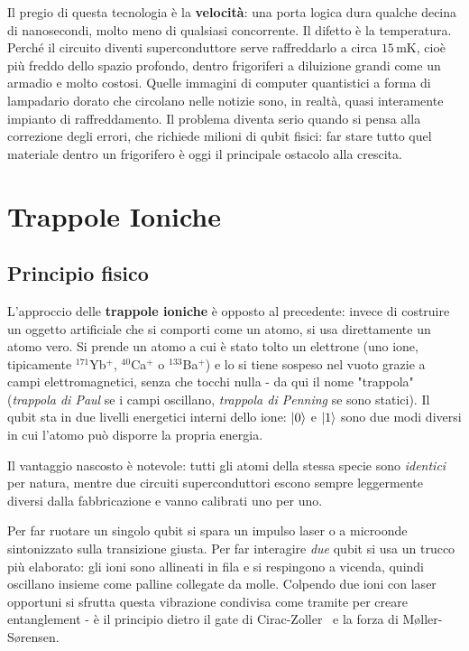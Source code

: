 Il pregio di questa tecnologia è la \textbf{velocità}: una porta logica dura
qualche decina di nanosecondi, molto meno di qualsiasi concorrente. Il difetto
è la temperatura. Perché il circuito diventi superconduttore serve raffreddarlo
a circa $15\,\text{mK}$, cioè più freddo dello spazio profondo, dentro
frigoriferi a diluizione grandi come un armadio e molto costosi. Quelle immagini
di computer quantistici a forma di lampadario dorato che circolano nelle notizie
sono, in realtà, quasi interamente impianto di raffreddamento. Il problema
diventa serio quando si pensa alla correzione degli errori, che richiede
milioni di qubit fisici: far stare tutto quel materiale dentro un frigorifero
è oggi il principale ostacolo alla crescita.

\section{Trappole Ioniche}
\label{sec:trap}

\subsection{Principio fisico}
\label{subsec:trap-principio}

L'approccio delle \textbf{trappole ioniche} è opposto al precedente: invece di
costruire un oggetto artificiale che si comporti come un atomo, si usa
direttamente un atomo vero. Si prende un atomo a cui è stato tolto un elettrone
(uno ione, tipicamente $^{171}$Yb$^+$, $^{40}$Ca$^+$ o $^{133}$Ba$^+$) e lo si
tiene sospeso nel vuoto grazie a campi elettromagnetici, senza che tocchi
nulla - da qui il nome "trappola" (\textit{trappola di Paul} se i campi
oscillano, \textit{trappola di Penning} se sono statici). Il qubit sta in due
livelli energetici interni dello ione: $\ket{0}$ e $\ket{1}$ sono due modi
diversi in cui l'atomo può disporre la propria energia.

Il vantaggio nascosto è notevole: tutti gli atomi della stessa specie sono
\textit{identici} per natura, mentre due circuiti superconduttori escono
sempre leggermente diversi dalla fabbricazione e vanno calibrati uno per uno.

Per far ruotare un singolo qubit si spara un impulso laser o a microonde
sintonizzato sulla transizione giusta. Per far interagire \textit{due} qubit si
usa un trucco più elaborato: gli ioni sono allineati in fila e si respingono a
vicenda, quindi oscillano insieme come palline collegate da molle. Colpendo
due ioni con laser opportuni si sfrutta questa vibrazione condivisa come
tramite per creare entanglement - è il principio dietro il gate di
Cirac-Zoller~\cite{cirac1995quantum} e la forza di Møller-Sørensen.

